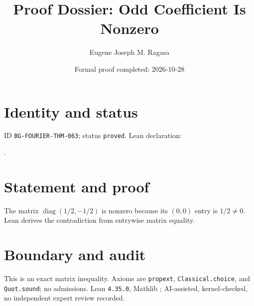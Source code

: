 \documentclass[11pt]{article}
\title{Proof Dossier: Odd Coefficient Is Nonzero}\author{Eugene Joseph M. Ragasa}\date{Formal proof completed: 2026-10-28}
\begin{document}
\raggedright\maketitle
\section{Identity and status}
ID \texttt{BG-FOURIER-THM-063}; status \texttt{proved}. Lean declaration:
\par{}.
\section{Statement and proof}
The matrix $\operatorname{diag}(1/2,-1/2)$ is nonzero because its $(0,0)$ entry is $1/2\ne0$. Lean derives the contradiction from entrywise matrix equality.
\section{Boundary and audit}
This is an exact matrix inequality. Axioms are \texttt{propext}, \texttt{Classical.choice}, and \texttt{Quot.sound}; no admissions. Lean \texttt{4.35.0}, Mathlib {\scriptsize{}}; AI-assisted, kernel-checked, no independent expert review recorded.
\end{document}
